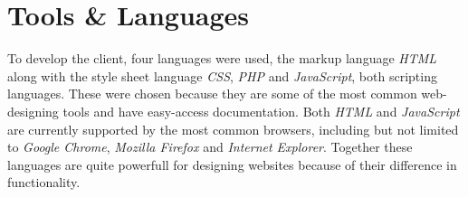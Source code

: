 \chapter{Tools \& Languages}

To develop the client, four languages were used, the markup language \textit{HTML} along with the style sheet language \textit{CSS}, \textit{PHP} and \textit{JavaScript}, both scripting languages. These were chosen because they are some of the most common web-designing tools and have easy-access documentation. Both \textit{HTML} and \textit{JavaScript} are currently supported by the most common browsers, including but not limited to \textit{Google Chrome}, \textit{Mozilla Firefox} and \textit{Internet Explorer}.
Together these languages are quite powerfull for designing websites because of their difference in functionality.
\label{implementation_tools_languages}
